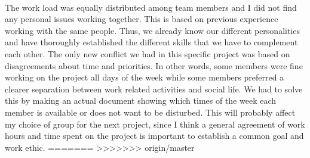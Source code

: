 \\
The work load was equally distributed among team members and I did not find any personal issues working together. This is based on previous experience working with the same people. Thus, we already know our different personalities and have thoroughly established the different skills that we have to complement each other. The only new conflict we had in this specific project was based on disagreements about time and priorities. In other words, some members were fine working on the project all days of the week while some members preferred a clearer separation between work related activities and social life. We had to solve this by making an actual document showing which times of the week each member is available or does not want to be disturbed. This will probably affect my choice of group for the next project, since I think a general agreement of work hours and time spent on the project is important to establish a common goal and work ethic. 
=======
>>>>>>> origin/master
